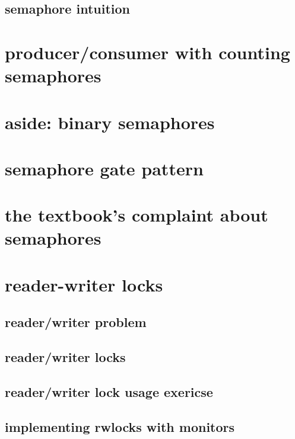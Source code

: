 \subsection{semaphore intuition}


\section{producer/consumer with counting semaphores}


\section{aside: binary semaphores}


\section{semaphore gate pattern}


\section{the textbook's complaint about semaphores}


\section{reader-writer locks}

\subsection{reader/writer problem}



\subsection{reader/writer locks}



\subsection{reader/writer lock usage exericse}



\subsection{implementing rwlocks with monitors}


